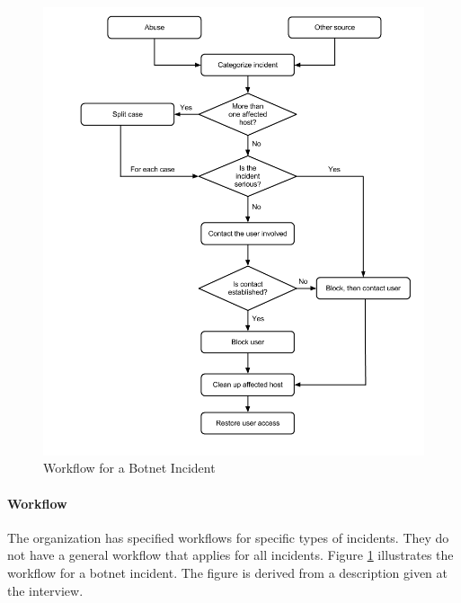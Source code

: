 \begin{figure}[H]
\hspace{-1.1cm}\includegraphics[scale=0.53]{WorkflowCaseABotnet.png}
\caption[Workflow for a Botnet Incident, Case A]{Workflow for a Botnet Incident}
\label{fig:WorkflowCaseABotnet}
\end{figure}

\paragraph{Workflow}
The organization has specified workflows for specific types of incidents. They do not have a general workflow that applies for all incidents. Figure \ref{fig:WorkflowCaseABotnet} illustrates the workflow for a botnet incident. The figure is derived from a description given at the interview. 

